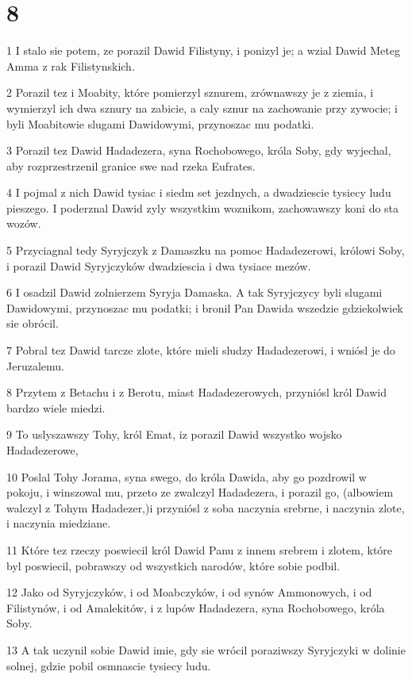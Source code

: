 \chapter{8}

\par 1 I stalo sie potem, ze porazil Dawid Filistyny, i ponizyl je; a wzial Dawid Meteg Amma z rak Filistynskich.
\par 2 Porazil tez i Moabity, które pomierzyl sznurem, zrównawszy je z ziemia, i wymierzyl ich dwa sznury na zabicie, a caly sznur na zachowanie przy zywocie; i byli Moabitowie slugami Dawidowymi, przynoszac mu podatki.
\par 3 Porazil tez Dawid Hadadezera, syna Rochobowego, króla Soby, gdy wyjechal, aby rozprzestrzenil granice swe nad rzeka Eufrates.
\par 4 I pojmal z nich Dawid tysiac i siedm set jezdnych, a dwadziescie tysiecy ludu pieszego. I poderznal Dawid zyly wszystkim woznikom, zachowawszy koni do sta wozów.
\par 5 Przyciagnal tedy Syryjczyk z Damaszku na pomoc Hadadezerowi, królowi Soby, i porazil Dawid Syryjczyków dwadziescia i dwa tysiace mezów.
\par 6 I osadzil Dawid zolnierzem Syryja Damaska. A tak Syryjczycy byli slugami Dawidowymi, przynoszac mu podatki; i bronil Pan Dawida wszedzie gdziekolwiek sie obrócil.
\par 7 Pobral tez Dawid tarcze zlote, które mieli sludzy Hadadezerowi, i wniósl je do Jeruzalemu.
\par 8 Przytem z Betachu i z Berotu, miast Hadadezerowych, przyniósl król Dawid bardzo wiele miedzi.
\par 9 To uslyszawszy Tohy, król Emat, iz porazil Dawid wszystko wojsko Hadadezerowe,
\par 10 Poslal Tohy Jorama, syna swego, do króla Dawida, aby go pozdrowil w pokoju, i winszowal mu, przeto ze zwalczyl Hadadezera, i porazil go, (albowiem walczyl z Tohym Hadadezer,)i przyniósl z soba naczynia srebrne, i naczynia zlote, i naczynia miedziane.
\par 11 Które tez rzeczy poswiecil król Dawid Panu z innem srebrem i zlotem, które byl poswiecil, pobrawszy od wszystkich narodów, które sobie podbil.
\par 12 Jako od Syryjczyków, i od Moabczyków, i od synów Ammonowych, i od Filistynów, i od Amalekitów, i z lupów Hadadezera, syna Rochobowego, króla Soby.
\par 13 A tak uczynil sobie Dawid imie, gdy sie wrócil poraziwszy Syryjczyki w dolinie solnej, gdzie pobil osmnascie tysiecy ludu.
